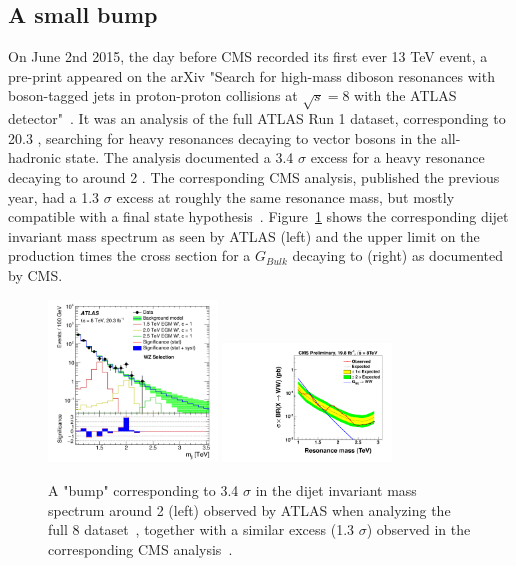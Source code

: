 \subsection{A small bump}
On June 2nd 2015, the day before CMS recorded its first ever 13 TeV event, a pre-print appeared on the arXiv "Search for high-mass diboson resonances with boson-tagged jets in proton-proton collisions at $\sqrt{s} = 8$ \TeV with the ATLAS detector"~\cite{Aad2015}.
It was an analysis of the full ATLAS Run 1 dataset, corresponding to 20.3 \fbinv, searching for heavy resonances decaying to vector bosons in the all-hadronic state. The analysis documented a 3.4 $\sigma$ excess for a heavy resonance decaying to \PW\PZ around 2 \TeV.
The corresponding CMS analysis, published the previous year, had a 1.3 $\sigma$ excess at roughly the same resonance mass, but mostly compatible with a \PW\PW final state hypothesis~\cite{Khachatryan:1700394}. Figure~\ref{fig:searchI:8tev} shows the corresponding dijet invariant mass spectrum as seen by ATLAS (left) and the upper limit on the production times the cross section for a $G_{Bulk}$ decaying to \PW\PW (right)  as documented by CMS.

\begin{figure}[ht] 
    \centering
    \includegraphics[width=0.4\textwidth]{figures/analysis/search1/misc/atlas_8tev.png}
    \includegraphics[width=0.4\textwidth]{figures/analysis/search1/misc/EXO-12-024_gWW.pdf}
    \caption{A "bump" corresponding to 3.4 $\sigma$ in the dijet invariant mass spectrum around 2 \TeV (left) observed by ATLAS when analyzing the full 8 \TeV dataset~\cite{Aad2015}, together with a similar excess (1.3 $\sigma$) observed in the corresponding CMS analysis~\cite{Khachatryan:1700394}.}
    \label{fig:searchI:8tev}
\end{figure}

